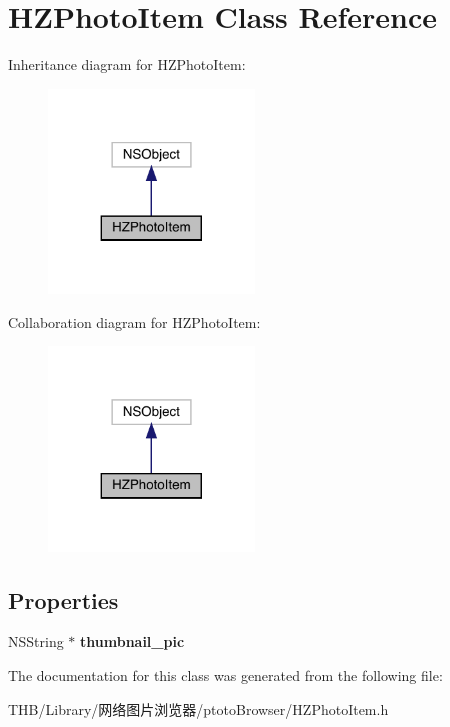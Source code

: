 \hypertarget{interface_h_z_photo_item}{}\section{H\+Z\+Photo\+Item Class Reference}
\label{interface_h_z_photo_item}


Inheritance diagram for H\+Z\+Photo\+Item\+:\nopagebreak
\begin{figure}[H]
\begin{center}
\leavevmode
\includegraphics[width=155pt]{interface_h_z_photo_item__inherit__graph}
\end{center}
\end{figure}


Collaboration diagram for H\+Z\+Photo\+Item\+:\nopagebreak
\begin{figure}[H]
\begin{center}
\leavevmode
\includegraphics[width=155pt]{interface_h_z_photo_item__coll__graph}
\end{center}
\end{figure}
\subsection*{Properties}
\begin{DoxyCompactItemize}
\item 
\mbox{\label{interface_h_z_photo_item_a215a731988e09590d3a5c83dc4e1b0ee}} 
N\+S\+String $\ast$ {\bfseries thumbnail\+\_\+pic}
\end{DoxyCompactItemize}


The documentation for this class was generated from the following file\+:\begin{DoxyCompactItemize}
\item 
T\+H\+B/\+Library/网络图片浏览器/ptoto\+Browser/H\+Z\+Photo\+Item.\+h\end{DoxyCompactItemize}
